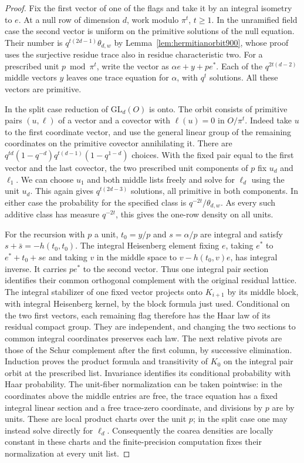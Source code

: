 \documentclass[a4paper,11pt]{article}
\theoremstyle{definition}
\theoremstyle{remark}
\numberwithin{equation}{section}
\begin{document}
\begin{proof}
Fix the first vector of one of the flags and take it by an
integral isometry to \(e\). At a null row of dimension \(d\),
work modulo \(\pi^t\), \(t\ge1\). In the unramified field case
the second vector is uniform on the primitive solutions of the
null equation. Their number is
\(q^{t(2d-1)}\theta_{d,w}\) by Lemma~\ref{lem:hermitianorbit900},
whose proof uses the surjective residue trace also in residue
characteristic two. For a prescribed unit \(p\bmod\pi^t\), write
the vector as \(\alpha e+y+p e^*\). Each of the
\(q^{2t(d-2)}\) middle vectors \(y\) leaves one trace equation
for \(\alpha\), with \(q^t\) solutions. All these vectors are
primitive.

In the split case reduction of \(\mathrm{GL}_d(O)\) is onto.
The orbit consists of primitive pairs \((u,\ell)\) of a vector
and a covector with \(\ell(u)=0\) in \(O/\pi^t\). Indeed take
\(u\) to the first coordinate vector, and use the general
linear group of the remaining coordinates on the primitive
covector annihilating it. There are
\(q^{td}(1-q^{-d})q^{t(d-1)}(1-q^{1-d})\) choices. With the
fixed pair equal to the first vector and the last covector, the
two prescribed unit components of \(p\) fix \(u_d\) and \(\ell_1\).
We can choose \(u_1\) and both middle lists freely and solve
for \(\ell_d\) using the unit \(u_d\). This again gives
\(q^{t(2d-3)}\) solutions, all primitive in both components.
In either case the probability for the specified class is
\(q^{-2t}/\theta_{d,w}\). As every such additive class has
measure \(q^{-2t}\), this gives the one-row density on all units.

For the recursion with \(p\) a unit, \(t_0=y/p\) and
\(s=\alpha/p\) are integral and satisfy
\(s+\bar s=-h(t_0,t_0)\). The integral Heisenberg element
fixing \(e\), taking \(e^*\) to \(e^*+t_0+s e\) and taking
\(v\) in the middle space to \(v-h(t_0,v)e\), has integral
inverse. It carries \(p e^*\) to the second vector. Thus one
integral pair section identifies their common orthogonal
complement with the original residual lattice. The integral
stabilizer of one fixed vector projects onto \(K_{i+1}\)
by its middle block, with integral Heisenberg kernel, by the
block formula just used. Conditional on the two first vectors,
each remaining flag therefore has the Haar law of its residual
compact group. They are independent, and changing the two
sections to common integral coordinates preserves each law.
The next relative pivots are those of the Schur complement
after the first column, by successive elimination. Induction
proves the product formula and transitivity of \(K_0\) on
the integral pair orbit at the prescribed list. Invariance
identifies its conditional probability with Haar probability.
The unit-fiber normalization can be taken pointwise: in the
coordinates above the middle entries are free, the trace
equation has a fixed integral linear section and a free
trace-zero coordinate, and divisions by \(p\) are by units.
These are local product charts over the unit \(p\); in the
split case one may instead solve directly for \(\ell_d\).
Consequently the coarea densities are locally constant in
these charts and the finite-precision computation fixes their
normalization at every unit list.
\end{proof}
\end{document}
